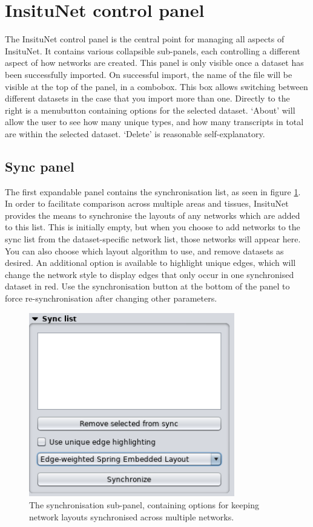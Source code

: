 \documentclass[a4paper,12pt]{article}
\begin{document}
\section{InsituNet control panel}

The InsituNet control panel is the central point for managing all aspects of InsituNet. It contains various collapsible sub-panels, each controlling a different aspect of how networks are created. This panel is only visible once a dataset has been successfully imported. On successful import, the name of the file will be visible at the top of the panel, in a combobox. This box allows switching between different datasets in the case that you import more than one. Directly to the right is a menubutton containing options for the selected dataset. `About' will allow the user to see how many unique types, and how many transcripts in total are within the selected dataset. `Delete' is reasonable self-explanatory.

\subsection{Sync panel}
The first expandable panel contains the synchronisation list, as seen in figure \ref{fig:sync}. In order to facilitate comparison across multiple areas and tissues, InsituNet provides the means to synchronise the layouts of any networks which are added to this list. This is initially empty, but when you choose to add networks to the sync list from the dataset-specific network list, those networks will appear here. You can also choose which layout algorithm to use, and remove datasets as desired. An additional option is available to highlight unique edges, which will change the network style to display edges that only occur in one synchronised dataset in red. Use the synchronisation button at the bottom of the panel to force re-synchronisation after changing other parameters.

\begin{figure}[htb]
	\caption{The synchronisation sub-panel, containing options for keeping network layouts synchronised across multiple networks.}\label{fig:sync}
	\centering
	\includegraphics[width=0.8\textwidth]{sync}
\end{figure}
\end{document}
